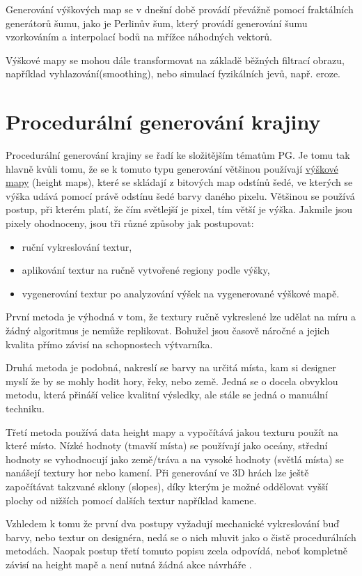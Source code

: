 Generování výškových map se v dnešní době provádí převážně pomocí fraktálních generátorů šumu, jako je Perlinův šum, který provádí generování šumu vzorkováním a interpolací bodů na mřížce náhodných vektorů.

Výškové mapy se mohou dále transformovat na základě běžných filtrací obrazu, například vyhlazování(smoothing), nebo simulací fyzikálních jevů, např. eroze. \cite{inproceedings}

\section{Procedurální generování krajiny}
\label{terrain}
Procedurální generování krajiny se řadí ke složitějším tématům PG. Je tomu tak hlavně kvůli tomu, že se k tomuto typu generování většinou používají \hyperref[heightMaps]{výškové mapy} (height maps), které se skládají z bitových map odstínů šedé, ve kterých se výška udává pomocí právě odstínu šedé barvy daného pixelu. Většinou se používá postup, při kterém platí, že čím světlejší je pixel, tím větší je výška. Jakmile jsou pixely ohodnoceny, jsou tři různé způsoby jak postupovat:
\begin{itemize}
	\item ruční vykreslování textur,
	\item aplikování textur na ručně vytvořené regiony podle výšky,
	\item vygenerování textur po analyzování výšek na vygenerované výškové mapě.
\end{itemize}
První metoda je výhodná v tom, že textury ručně vykreslené lze udělat na míru a žádný algoritmus je nemůže replikovat. Bohužel jsou časově náročné a jejich kvalita přímo závisí na schopnostech výtvarníka.

Druhá metoda je podobná, nakreslí se barvy na určitá místa, kam si designer myslí že by se mohly hodit hory, řeky, nebo země. Jedná se o docela obvyklou metodu, která přináší velice kvalitní výsledky, ale stále se jedná o manuální techniku.

Třetí metoda používá data height mapy a vypočítává jakou texturu použít na které místo. Nízké hodnoty (tmavší místa) se používají jako oceány, střední hodnoty se vyhodnocují jako země/tráva a na vysoké hodnoty (světlá místa) se nanášejí textury hor nebo kamení. Při generování ve 3D hrách lze ještě započítávat takzvané sklony (slopes), díky kterým je možné oddělovat vyšší plochy od nižších pomocí dalších textur například kamene.

Vzhledem k tomu že první dva postupy vyžadují mechanické vykreslování buď barvy, nebo textur on designéra, nedá se o nich mluvit jako o čistě procedurálních metodách. Naopak postup třetí tomuto popisu zcela odpovídá, neboť kompletně závisí na height mapě a není nutná žádná akce návrháře \cite{madoc59000}.


